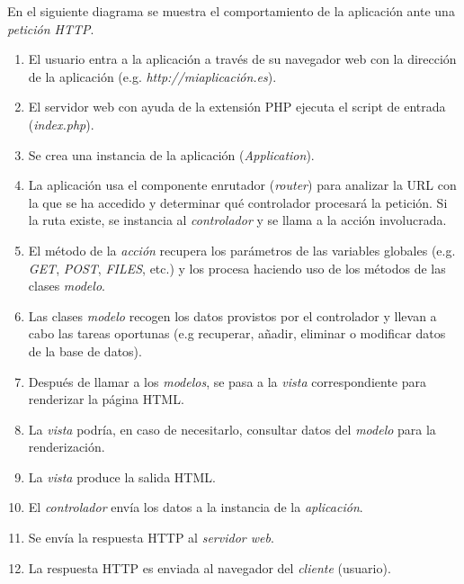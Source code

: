 
En el siguiente diagrama se muestra el comportamiento de la aplicación
ante una \emph{petición HTTP}.


\begin{enumerate}
\def\labelenumi{\arabic{enumi}.}
\tightlist
\item
  El usuario entra a la aplicación a través de su navegador web con la
  dirección de la aplicación (e.g. \emph{http://miaplicación.es}).
\item
  El servidor web con ayuda de la extensión PHP ejecuta el script de
  entrada (\emph{index.php}).
\item
  Se crea una instancia de la aplicación (\emph{Application}).
\item
  La aplicación usa el componente enrutador (\emph{router}) para
  analizar la URL con la que se ha accedido y determinar qué controlador
  procesará la petición. Si la ruta existe, se instancia al
  \emph{controlador} y se llama a la acción involucrada.
\item
  El método de la \emph{acción} recupera los parámetros de las variables
  globales (e.g. \emph{GET}, \emph{POST}, \emph{FILES}, etc.) y los
  procesa haciendo uso de los métodos de las clases \emph{modelo}.
\item
  Las clases \emph{modelo} recogen los datos provistos por el
  controlador y llevan a cabo las tareas oportunas (e.g recuperar,
  añadir, eliminar o modificar datos de la base de datos).
\item
  Después de llamar a los \emph{modelos}, se pasa a la \emph{vista}
  correspondiente para renderizar la página HTML.
\item
  La \emph{vista} podría, en caso de necesitarlo, consultar datos del
  \emph{modelo} para la renderización.
\item
  La \emph{vista} produce la salida HTML.
\item
  El \emph{controlador} envía los datos a la instancia de la
  \emph{aplicación}.
\item
  Se envía la respuesta HTTP al \emph{servidor web}.
\item
  La respuesta HTTP es enviada al navegador del \emph{cliente}
  (usuario).
\end{enumerate}

